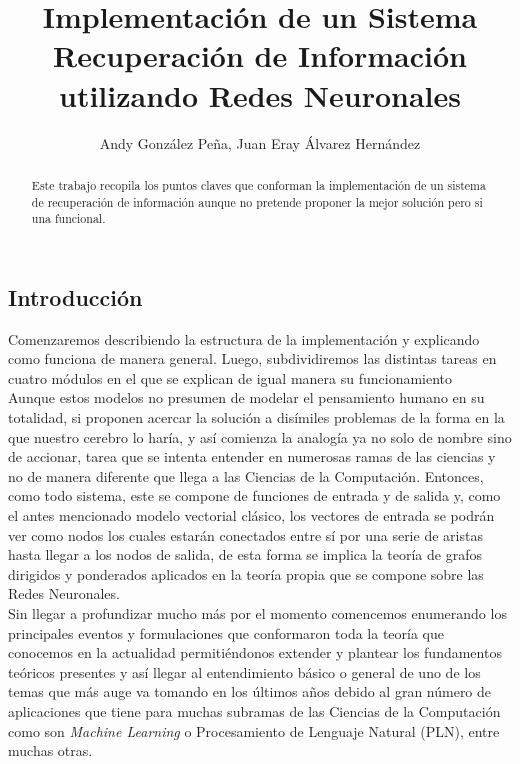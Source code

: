 \documentclass{llncs}
\begin{document}
\title{Implementaci\'on de un Sistema Recuperaci\'on de Informaci\'on utilizando Redes Neuronales}

\author{Andy Gonz\'alez Pe\~na, Juan Eray \'Alvarez Hern\'andez}

\maketitle

\begin{multicols}{2}[]

\begin{abstract}

Este trabajo recopila los puntos claves que conforman la implementaci\'on de un sistema de recuperaci\'on
de informaci\'on aunque no pretende proponer la mejor soluci\'on pero si una funcional.

\end{abstract}

\section{Introducci\'on}\label{sec:Introduction}

Comenzaremos describiendo la estructura de la implementaci\'on y explicando como funciona de manera general.
Luego, subdividiremos las distintas tareas en cuatro m\'odulos en el que se explican de igual manera su funcionamiento\\

Aunque estos modelos no presumen de mode\-lar el pensamiento humano en su totalidad, si proponen acercar la
soluci\'on a dis\'imiles pro\-blemas de la forma en la que nuestro cerebro lo har\'ia, y as\'i comienza la analog\'ia ya no
solo de nombre sino de accionar, tarea que se intenta entender en numerosas ramas de las ciencias y no de manera
diferente que llega a las Ciencias de la Computaci\'on. Entonces, como todo sistema, este se compone de funciones de
entrada y de salida y, como el antes mencionado modelo vectorial cl\'asico, los vectores de entrada se podr\'an ver
como nodos los cuales estar\'an conectados entre s\'i por una serie de aristas hasta llegar a los nodos de salida,
de esta forma se implica la teor\'ia de grafos dirigidos y ponderados aplicados en la teor\'ia propia que se compone
sobre las Redes Neuronales. \\

Sin llegar a profundizar mucho m\'as por el momento comencemos enumerando los principales eventos y formulaciones
que conformaron toda la teor\'ia que conocemos en la actualidad permiti\'endonos extender y plantear los fundamentos
te\'oricos presentes y as\'i llegar al entendimiento b\'asico o general de uno de los temas que m\'as auge va tomando en
los \'ultimos a\~nos debido al gran n\'umero de aplicaciones que tiene para muchas subramas de las Ciencias de la
Computaci\'on como son \textit{Machine Learning} o Procesamiento de Lenguaje Natural (PLN), entre muchas otras. 


\end{multicols}
\end{document}

